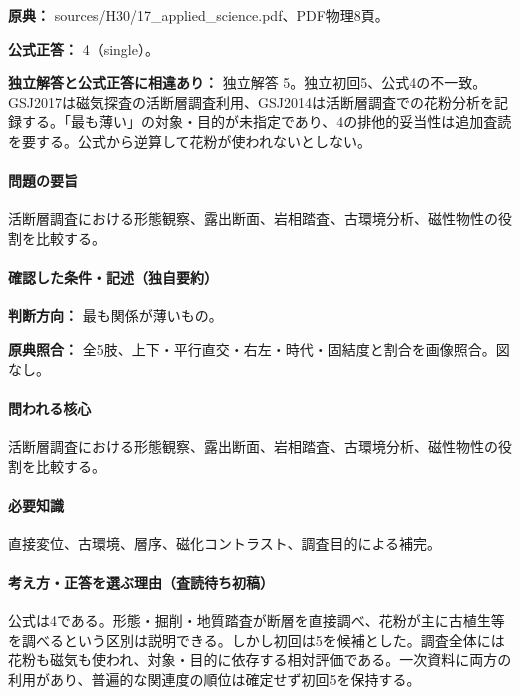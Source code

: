 \noindent\textbf{原典：} sources/H30/17\_applied\_science.pdf、PDF物理8頁。

\textbf{公式正答：} 4（single）。

\par\textbf{独立解答と公式正答に相違あり：} 独立解答 5。独立初回5、公式4の不一致。GSJ2017は磁気探査の活断層調査利用、GSJ2014は活断層調査での花粉分析を記録する。「最も薄い」の対象・目的が未指定であり、4の排他的妥当性は追加査読を要する。公式から逆算して花粉が使われないとしない。

\paragraph{問題の要旨} 活断層調査における形態観察、露出断面、岩相踏査、古環境分析、磁性物性の役割を比較する。

\paragraph{確認した条件・記述（独自要約）}\mbox{}\par

\noindent\textbf{判断方向：} 最も関係が薄いもの。\par

\noindent\textbf{原典照合：} 全5肢、上下・平行直交・右左・時代・固結度と割合を画像照合。図なし。\par

\paragraph{問われる核心} 活断層調査における形態観察、露出断面、岩相踏査、古環境分析、磁性物性の役割を比較する。

\paragraph{必要知識} 直接変位、古環境、層序、磁化コントラスト、調査目的による補完。

\paragraph{考え方・正答を選ぶ理由（査読待ち初稿）} 公式は4である。形態・掘削・地質踏査が断層を直接調べ、花粉が主に古植生等を調べるという区別は説明できる。しかし初回は5を候補とした。調査全体には花粉も磁気も使われ、対象・目的に依存する相対評価である。一次資料に両方の利用があり、普遍的な関連度の順位は確定せず初回5を保持する。

